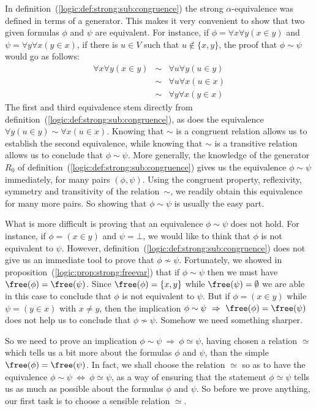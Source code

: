 In definition~(\ref{logic:def:strong:sub:congruence}) the strong
$\alpha$-equivalence was defined in terms of a generator. This
makes it very convenient to show that two given formulas $\phi$ and
$\psi$ are equivalent. For instance, if $\phi=\forall x\forall
y(x\in y)$ and $\psi=\forall y\forall x(y\in x)$, if there is $u\in
V$ such that $u\not\in\{x,y\}$, the proof that $\phi\sim\psi$ would
go as follows:
    \begin{eqnarray*}
    \forall x\forall y(x\in y)&\sim&\forall u\forall y(u\in y)\\
    &\sim&\forall u\forall x(u\in x)\\
    &\sim&\forall y\forall x(y\in x)
    \end{eqnarray*}
The first and third equivalence stem directly from
definition~(\ref{logic:def:strong:sub:congruence}), as does the
equivalence $\forall y(u\in y)\sim\forall x(u\in x)$. Knowing that
$\sim$ is a congruent relation allows us to establish the second
equivalence, while knowing that $\sim$ is a transitive relation
allows us to conclude that $\phi\sim\psi$. More generally, the
knowledge of the generator $R_{0}$ of
definition~(\ref{logic:def:strong:sub:congruence}) gives us the
equivalence $\phi\sim\psi$ immediately, for many pairs
$(\phi,\psi)$. Using the congruent property, reflexivity, symmetry
and transitivity of the relation~$\sim$, we readily obtain this
equivalence for many more pairs. So showing that $\phi\sim\psi$ is
usually the easy part.

What is more difficult is proving that an equivalence $\phi\sim\psi$
does not hold. For instance, if $\phi=(x\in y)$ and $\psi=\bot$, we
would like to think that $\phi$ is not equivalent to $\psi$.
However, definition~(\ref{logic:def:strong:sub:congruence}) does not
give us an immediate tool to prove that $\phi\not\sim\psi$.
Fortunately, we showed in
proposition~(\ref{logic:prop:strong:freevar}) that if $\phi\sim\psi$
then we must have $\free(\phi)=\free(\psi)$. Since
$\free(\phi)=\{x,y\}$ while $\free(\psi)=\emptyset$ we are able in
this case to conclude that $\phi$ is not equivalent to $\psi$. But
if $\phi=(x\in y)$ while $\psi=(y\in x)$ with $x\neq y$, then the
implication $\phi\sim\psi\ \Rightarrow\ \free(\phi)=\free(\psi)$
does not help us to conclude that $\phi\not\sim\psi$. Somehow we
need something sharper.

So we need to prove an implication $\phi\sim\psi\ \Rightarrow\
\phi\simeq\psi$, having chosen a relation $\simeq$ which tells us a
bit more about the formulas $\phi$ and $\psi$, than the simple
$\free(\phi)=\free(\psi)$. In fact, we shall choose the relation
$\simeq$ so as to have the equivalence $\phi\sim\psi\
\Leftrightarrow\ \phi\simeq\psi$, as a way of ensuring that the
statement $\phi\simeq\psi$ tells us as much as possible about the
formulas $\phi$ and $\psi$. So before we prove anything, our first
task is to choose a sensible relation $\simeq$.

